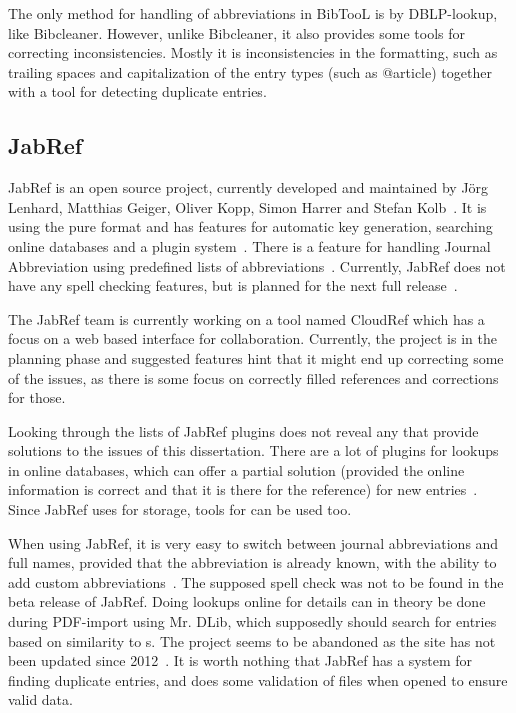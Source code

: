 The only method for handling of abbreviations in BibTooL is by
DBLP-lookup, like Bibcleaner.  However, unlike Bibcleaner, it also
provides some tools for correcting inconsistencies.  Mostly it is
inconsistencies in the formatting, such as trailing spaces and
capitalization of the entry types (such as @article) together with a
tool for detecting duplicate entries.

\subsection{JabRef}
JabRef is an open source project, currently developed and maintained
by Jörg Lenhard, Matthias Geiger, Oliver Kopp, Simon Harrer and Stefan
Kolb~\cite{jabref_developers}.  It is using the pure {\bibtex} format
and has features for automatic key generation, searching online
databases and a plugin system~\cite{jabref_features}.  There is a
feature for handling Journal Abbreviation using predefined lists of
abbreviations~\cite{jabref_abbreviations}.  Currently, JabRef does not
have any spell checking features, but is planned for the next full
release~\cite{jabref_spellchecker}.

The JabRef team is currently working on a tool named CloudRef which
has a focus on a web based interface for collaboration.  Currently,
the project is in the planning phase and suggested features hint that
it might end up correcting some of the issues, as there is some focus
on correctly filled {\bibtex} references and corrections for those.

Looking through the lists of JabRef plugins does not reveal any that
provide solutions to the issues of this dissertation.  There are a lot
of plugins for lookups in online databases, which can offer a partial
solution (provided the online information is correct and that it is
there for the reference) for new entries~\cite{jabref_resources}.
Since JabRef uses {\bibtex} for storage, tools for {\bibtex} can be
used too.

When using JabRef, it is very easy to switch between journal
abbreviations and full names, provided that the abbreviation is
already known, with the ability to add custom
abbreviations~\cite{jabref_abbreviations}.  The supposed spell check
was not to be found in the beta release of JabRef.  Doing lookups
online for details can in theory be done during PDF-import using
Mr. DLib, which supposedly should search for entries based on
similarity to s.  The project seems to be abandoned as the
site has not been updated since
2012~\cite{jabref_mrdlib,jabref_mrdlib_notice}.  It is worth nothing
that JabRef has a system for finding duplicate entries, and does some
validation of {\bibtex} files when opened to ensure valid data.

